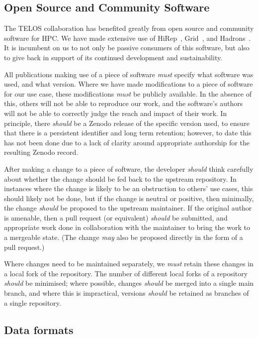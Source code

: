 \documentclass{article}
\newcommand\rfcword[1]{\emph{#1}\xspace}
\newcommand\must{\rfcword{must}}
\newcommand\should{\rfcword{should}}
\newcommand\may{\rfcword{may}}
\begin{document}
\subsection{Open Source and Community Software}

The TELOS collaboration has benefited greatly from open source and community software for HPC\@.
We have made extensive use of HiRep~\cite{hirep,DelDebbio:2008zf},
Grid~\cite{grid,Yamaguchi:2022feu},
and Hadrons~\cite{hadrons,antonin_portelli_2023_8023716}.
It is incumbent on us to not only be passive consumers of this software,
but also to give back in support of its continued development and sustainability.

All publications making use of a piece of software
\must specify what software was used,
and what version.
Where we have made modifications to a piece of software for our use case,
these modifications \must be publicly available.
In the absence of this,
others will not be able to reproduce our work,
and the software's authors will not be able to correctly judge
the reach and impact of their work.
In principle,
there \should be a Zenodo release of the specific version used,
to ensure that there is a persistent identifier and long term retention;
however,
to date this has not been done due to
a lack of clarity around appropriate authorship for the resulting Zenodo record.

After making a change to a piece of software,
the developer \should think carefully about whether
the change should be fed back to the upstream repository.
In instances where the change is likely to be an obstruction to others' use cases,
this should likely not be done,
but if the change is neutral or positive,
then minimally,
the change \should be proposed to the upstream maintainer.
If the original author is amenable,
then a pull request
(or equivalent)
\should be submitted,
and appropriate work done in collaboration with the maintainer
to bring the work to a mergeable state.
(The change \may also be proposed directly in the form of a pull request.)

Where changes need to be maintained separately,
we \must retain these changes in a local fork of the repository.
The number of different local forks of a repository \should be minimised;
where possible,
changes \should be merged into a single main branch,
and where this is impractical,
versions \should be retained as branches of a single repository.

\subsection{Data formats}
\end{document}
